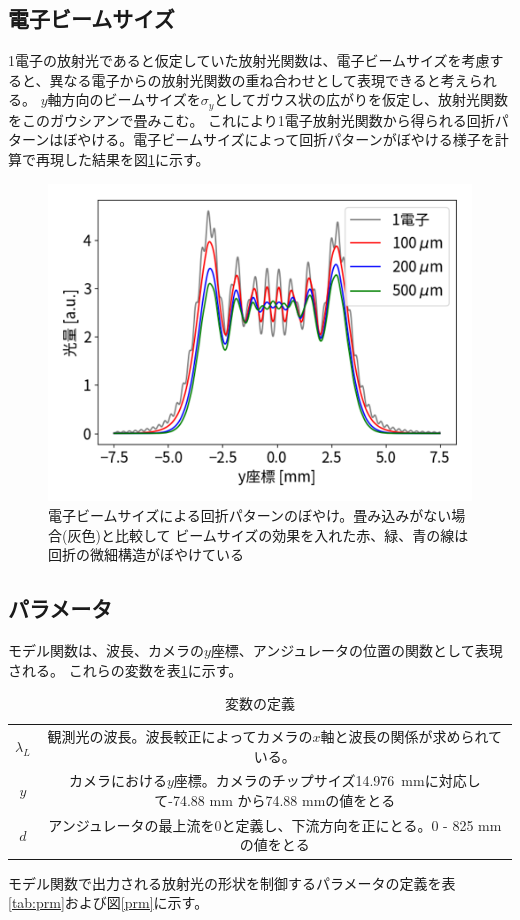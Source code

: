\documentclass[a4paper,11pt,uplatex]{jsbook}
\begin{document}
\subsection{電子ビームサイズ}
1電子の放射光であると仮定していた放射光関数は、電子ビームサイズを考慮すると、異なる電子からの放射光関数の重ね合わせとして表現できると考えられる。
$y$軸方向のビームサイズを$\sigma_y$としてガウス状の広がりを仮定し、放射光関数をこのガウシアンで畳みこむ。
これにより1電子放射光関数から得られる回折パターンはぼやける。電子ビームサイズによって回折パターンがぼやける様子を計算で再現した結果を図\ref{beamsize}に示す。
\begin{figure}
  \centering
  \includegraphics[width=0.8\linewidth]{image/4-esize.png}
  \caption[電子ビームサイズによる回折パターンのぼやけ]{電子ビームサイズによる回折パターンのぼやけ。畳み込みがない場合(灰色)と比較して
  ビームサイズの効果を入れた赤、緑、青の線は回折の微細構造がぼやけている}\label{beamsize}
\end{figure}

\subsection{パラメータ}
モデル関数は、波長、カメラの$y$座標、アンジュレータの位置の関数として表現される。
これらの変数を表\ref{tab:variables}に示す。
\begin{table}[h]
  \centering
  \begin{tabular}{c|c}
    $\lambda_L$ & 観測光の波長。波長較正によってカメラの$x$軸と波長の関係が求められている。\\
    $y$ & カメラにおける$y$座標。カメラのチップサイズ14.976~mmに対応して-74.88 mm から74.88 mmの値をとる\\
    $d$ & アンジュレータの最上流を0と定義し、下流方向を正にとる。0 - 825 mmの値をとる\\
  \end{tabular}
  \caption[変数の定義]{変数の定義}\label{tab:variables}
\end{table}
モデル関数で出力される放射光の形状を制御するパラメータの定義を表\ref{tab:prm}および図\ref{prm}に示す。
\end{document}
